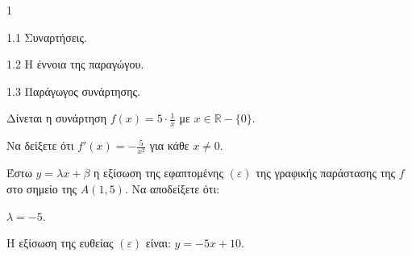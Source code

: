 \begin{ylh}{1}
    \item 1.1 Συναρτήσεις.
    \item 1.2 Η έννοια της παραγώγου.
    \item 1.3 Παράγωγος συνάρτησης.
\end{ylh}
Δίνεται η συνάρτηση $f(x) = 5 \cdot \frac{1}{x}$ με $x \in \mathbb{R} - \{0\}$.
\begin{alist}
    \item Να δείξετε ότι $f'(x) = - \frac{5}{x^2}$ για κάθε $x \neq 0$. 
\end{alist}
Έστω $y = \lambda x + \beta$ η εξίσωση της εφαπτομένης $(\varepsilon)$ της γραφικής παράστασης της $f$ στο σημείο της $A(1,5)$. Να αποδείξετε ότι:
\begin{alist} \setcounter{alisti}{1}
    \item $\lambda = -5$. 
    \item Η εξίσωση της ευθείας $(\varepsilon)$ είναι: $y = -5x + 10$. 
\end{alist}

